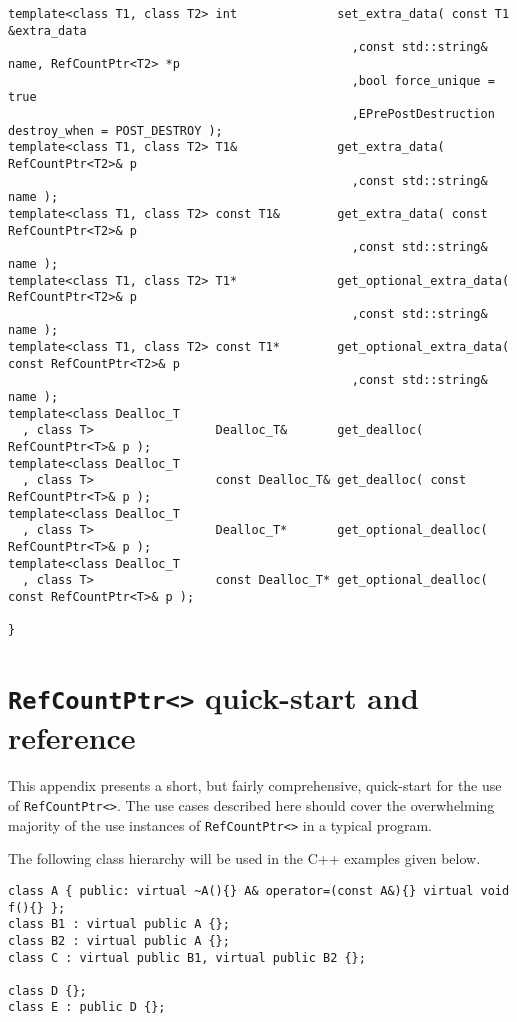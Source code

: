 \documentclass[pdf,ps2pdf,11pt]{SANDreport}
\begin{document}
{\scriptsize\begin{verbatim}
template<class T1, class T2> int              set_extra_data( const T1 &extra_data
                                                ,const std::string& name, RefCountPtr<T2> *p
                                                ,bool force_unique = true
                                                ,EPrePostDestruction destroy_when = POST_DESTROY );
template<class T1, class T2> T1&              get_extra_data( RefCountPtr<T2>& p
                                                ,const std::string& name );
template<class T1, class T2> const T1&        get_extra_data( const RefCountPtr<T2>& p
                                                ,const std::string& name );
template<class T1, class T2> T1*              get_optional_extra_data( RefCountPtr<T2>& p
                                                ,const std::string& name );
template<class T1, class T2> const T1*        get_optional_extra_data( const RefCountPtr<T2>& p
                                                ,const std::string& name );
template<class Dealloc_T
  , class T>                 Dealloc_T&       get_dealloc( RefCountPtr<T>& p );
template<class Dealloc_T
  , class T>                 const Dealloc_T& get_dealloc( const RefCountPtr<T>& p );
template<class Dealloc_T
  , class T>                 Dealloc_T*       get_optional_dealloc( RefCountPtr<T>& p );
template<class Dealloc_T
  , class T>                 const Dealloc_T* get_optional_dealloc( const RefCountPtr<T>& p );

}
\end{verbatim}}

%
\section{\texttt{RefCountPtr<>} quick-start and reference}
\label{rcpqs:apdx:quickstart}
%

This appendix presents a short, but fairly comprehensive, quick-start
for the use of {}\texttt{Ref\-Count\-Ptr<>}.  The use cases described
here should cover the overwhelming majority of the use instances of
{}\texttt{Ref\-Count\-Ptr<>} in a typical program.

The following class hierarchy will be used in the C++ examples given
below.

{\small\begin{verbatim}
class A { public: virtual ~A(){} A& operator=(const A&){} virtual void f(){} };
class B1 : virtual public A {};
class B2 : virtual public A {};
class C : virtual public B1, virtual public B2 {};

class D {};
class E : public D {};
\end{verbatim}}
\end{document}
